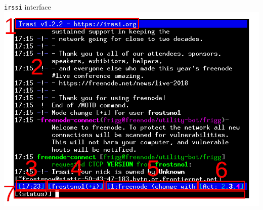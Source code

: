 \documentclass{beamer}
\begin{document}
\begin{frame}{\texttt{irssi} interface}
	\includegraphics[scale=1.75]{win1.png}
\end{frame}
\end{document}
